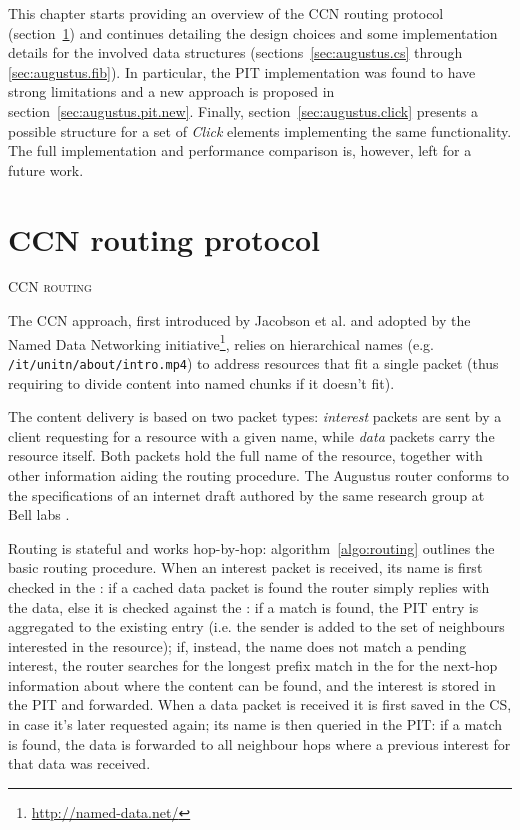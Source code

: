 \documentclass[12pt,a4paper,twoside]{book}
\newcommand{\mono}[1]{\texttt{#1}}
\begin{document}
This chapter starts providing an overview of the CCN routing protocol (section~\ref{sec:augustus.ccn}) and continues detailing the design choices and some implementation details for the involved data structures (sections~\ref{sec:augustus.cs} through \ref{sec:augustus.fib}).
In particular, the \gls{PIT} implementation was found to have strong limitations and a new approach is proposed in section~\ref{sec:augustus.pit.new}.
Finally, section~\ref{sec:augustus.click} presents a possible structure for a set of \textit{Click} elements implementing the same functionality. The full implementation and performance comparison is, however, left for a future work.

\section{CCN routing protocol}\label{sec:augustus.ccn}
\begin{algorithm}[htb]
  \DontPrintSemicolon
  \caption[CCN routing]{\textsc{CCN routing}}
  \label{algo:routing}
\end{algorithm}

The \gls{CCN} approach, first introduced by Jacobson et al. \cite{ccn} and adopted by the Named Data Networking initiative\footnote{\url{http://named-data.net/}}, relies on hierarchical names (e.g. \mono{/it/unitn/about/intro.mp4}) to address resources that fit a single packet (thus requiring to divide content into named chunks if it doesn't fit).

The content delivery is based on two packet types: \textit{interest} packets are sent by a client requesting for a resource with a given name, while \textit{data} packets carry the resource itself. Both packets hold the full name of the resource, together with other information aiding the routing procedure.
The Augustus router conforms to the specifications of an internet draft authored by the same research group at Bell labs \cite{icn-packet}.

Routing is stateful and works hop-by-hop: algorithm~\ref{algo:routing} outlines the basic routing procedure. When an interest packet is received, its name is first checked in the : if a cached data packet is found the router simply replies with the data, else it is checked against the : if a match is found, the PIT entry is aggregated to the existing entry (i.e. the sender is added to the set of neighbours interested in the resource); if, instead, the name does not match a pending interest, the router searches for the longest prefix match in the  for the next-hop information about where the content can be found, and the interest is stored in the PIT and forwarded.
When a data packet is received it is first saved in the CS, in case it's later requested again; its name is then queried in the PIT: if a match is found, the data is forwarded to all neighbour hops where a previous interest for that data was received.
\end{document}
